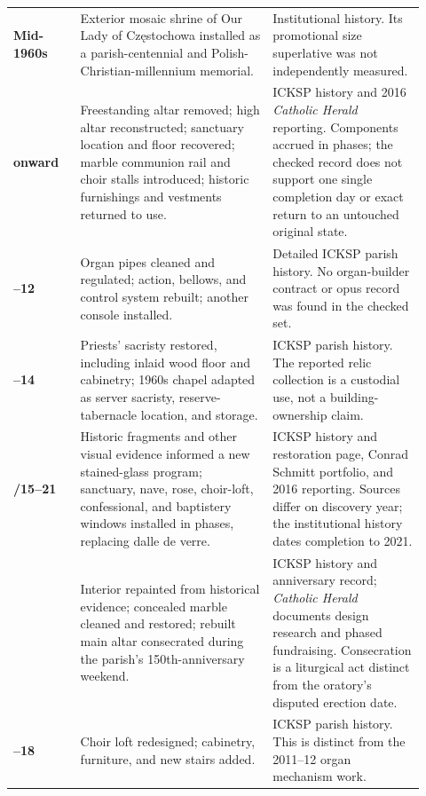\begin{longtable}{>{\bfseries\RaggedRight\arraybackslash}p{0.15\linewidth}>{\RaggedRight\arraybackslash}p{0.43\linewidth}>{\RaggedRight\arraybackslash}p{0.34\linewidth}}
Mid-1960s & Exterior mosaic shrine of Our Lady of Częstochowa installed as a parish-centennial and Polish-Christian-millennium memorial. & Institutional history. Its promotional size superlative was not independently measured.\\

2008 onward & Freestanding altar removed; high altar reconstructed; sanctuary location and floor recovered; marble communion rail and choir stalls introduced; historic furnishings and vestments returned to use. & ICKSP history and 2016 \emph{Catholic Herald} reporting. Components accrued in phases; the checked record does not support one single completion day or exact return to an untouched original state.\\

2011--12 & Organ pipes cleaned and regulated; action, bellows, and control system rebuilt; another console installed. & Detailed ICKSP parish history. No organ-builder contract or opus record was found in the checked set.\\

2013--14 & Priests' sacristy restored, including inlaid wood floor and cabinetry; 1960s chapel adapted as server sacristy, reserve-tabernacle location, and storage. & ICKSP parish history. The reported relic collection is a custodial use, not a building-ownership claim.\\

2014/15--21 & Historic fragments and other visual evidence informed a new stained-glass program; sanctuary, nave, rose, choir-loft, confessional, and baptistery windows installed in phases, replacing dalle de verre. & ICKSP history and restoration page, Conrad Schmitt portfolio, and 2016 reporting. Sources differ on discovery year; the institutional history dates completion to 2021.\\

2016 & Interior repainted from historical evidence; concealed marble cleaned and restored; rebuilt main altar consecrated during the parish's 150th-anniversary weekend. & ICKSP history and anniversary record; \emph{Catholic Herald} documents design research and phased fundraising. Consecration is a liturgical act distinct from the oratory's disputed erection date.\\

2017--18 & Choir loft redesigned; cabinetry, furniture, and new stairs added. & ICKSP parish history. This is distinct from the 2011--12 organ mechanism work.\\


\end{longtable}
